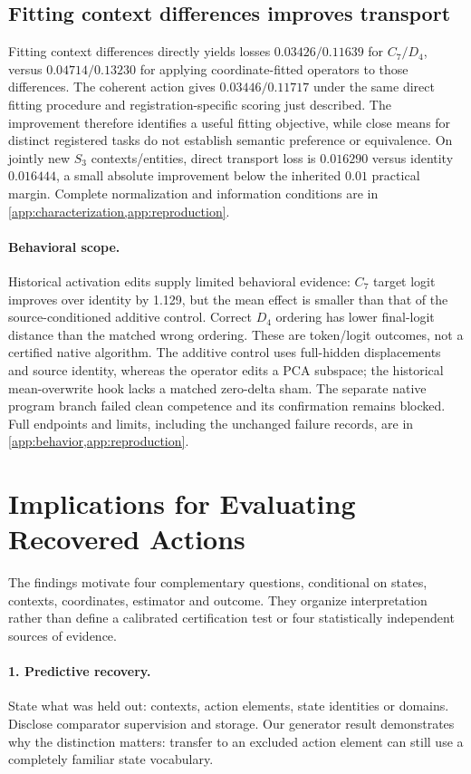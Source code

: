 \documentclass{article}
\begin{document}
\subsection{Fitting context differences improves transport}
Fitting context differences directly yields losses $0.03426/0.11639$ for $C_7/D_4$, versus $0.04714/0.13230$ for applying coordinate-fitted operators to those differences. The coherent action gives $0.03446/0.11717$ under the same direct fitting procedure and registration-specific scoring just described. The improvement therefore identifies a useful fitting objective, while close means for distinct registered tasks do not establish semantic preference or equivalence. On jointly new $S_3$ contexts/entities, direct transport loss is $0.016290$ versus identity $0.016444$, a small absolute improvement below the inherited $0.01$ practical margin. Complete normalization and information conditions are in \cref{app:characterization,app:reproduction}.

\paragraph{Behavioral scope.}
Historical activation edits supply limited behavioral evidence: $C_7$ target logit improves over identity by 1.129, but the mean effect is smaller than that of the source-conditioned additive control. Correct $D_4$ ordering has lower final-logit distance than the matched wrong ordering. These are token/logit outcomes, not a certified native algorithm. The additive control uses full-hidden displacements and source identity, whereas the operator edits a PCA subspace; the historical mean-overwrite hook lacks a matched zero-delta sham. The separate native program branch failed clean competence and its confirmation remains blocked. Full endpoints and limits, including the unchanged failure records, are in \cref{app:behavior,app:reproduction}.

\section{Implications for Evaluating Recovered Actions}
\label{sec:reading-protocol}
The findings motivate four complementary questions, conditional on states, contexts, coordinates, estimator and outcome. They organize interpretation rather than define a calibrated certification test or four statistically independent sources of evidence.

\paragraph{1. Predictive recovery.}
State what was held out: contexts, action elements, state identities or domains. Disclose comparator supervision and storage. Our generator result demonstrates why the distinction matters: transfer to an excluded action element can still use a completely familiar state vocabulary.
\end{document}
